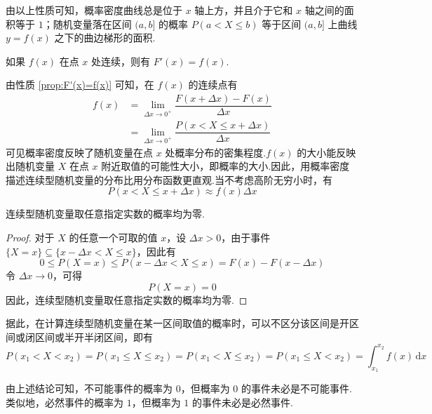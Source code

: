 由以上性质可知，概率密度曲线总是位于 $x$ 轴上方，并且介于它和 $x$ 轴之间的面积等于 $1$；随机变量落在区间 $(a,b]$ 的概率 $P(a < X \leqslant b)$ 等于区间 $(a,b]$ 上曲线 $y=f(x)$ 之下的曲边梯形的面积.

\begin{property}[][][prop:F'(x)=f(x)]
    \indent 如果 $f(x)$ 在点 $x$ 处连续，则有 $F'(x)=f(x)$.
\end{property}

由性质 \ref{prop:F'(x)=f(x)} 可知，在 $f(x)$ 的连续点有
$$
\begin{aligned}
    f(x) &= \lim_{\Delta x \to 0^+} \dfrac{F(x + \Delta x)-F(x)}{\Delta x}\\
    &= \lim_{\Delta x \to 0^+} \dfrac{P(x < X \leqslant x + \Delta x)}{\Delta x}
\end{aligned}
$$
可见概率密度反映了随机变量在点 $x$ 处概率分布的密集程度.$f(x)$ 的大小能反映出随机变量 $X$ 在点 $x$ 附近取值的可能性大小，即概率的大小.因此，用概率密度描述连续型随机变量的分布比用分布函数更直观.当不考虑高阶无穷小时，有
$$
P(x < X \leqslant x + \Delta x) \approx f(x) \Delta x
$$

\begin{conclusion}
    \indent 连续型随机变量取任意指定实数的概率均为零.
\end{conclusion}

\begin{proof}
    对于 $X$ 的任意一个可取的值 $x$，设 $\Delta x > 0$，由于事件 $\{X=x\} \subseteq \{x - \Delta x < X \leqslant x\}$，因此有
    $$
    0 \leqslant P(X=x) \leqslant P(x - \Delta x < X \leqslant x) = F(x)-F(x-\Delta x)
    $$
    令 $\Delta x \to 0$，可得
    $$
    P(X=x)=0
    $$
    因此，连续型随机变量取任意指定实数的概率均为零.
\end{proof}

据此，在计算连续型随机变量在某一区间取值的概率时，可以不区分该区间是开区间或闭区间或半开半闭区间，即有
$$
P(x_1 < X < x_2) = P(x_1 \leqslant X \leqslant x_2) = P(x_1 < X \leqslant x_2) = P(x_1 \leqslant X < x_2) = \int_{x_1}^{x_2} f(x)\,\text{d}x
$$

由上述结论可知，不可能事件的概率为 $0$，但概率为 $0$ 的事件未必是不可能事件.类似地，必然事件的概率为 $1$，但概率为 $1$ 的事件未必是必然事件.

